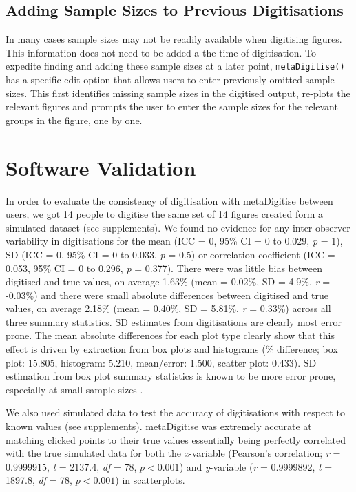 \documentclass[12pt]{article}
\newcommand{\fct}[1]{\texttt{#1()}}
\newcommand{\pkg}[1]{{\fontseries{b}\selectfont #1}}
\begin{document}
\subsection{Adding Sample Sizes to Previous Digitisations}
In many cases sample sizes may not be readily available when digitising figures. This information does not need to be added a the time of digitisation. To expedite finding and adding these sample sizes at a later point, \fct{metaDigitise} has a specific edit option that allows users to enter previously omitted sample sizes. This first identifies missing sample sizes in the digitised output, re-plots the relevant figures and prompts the user to enter the sample sizes for the relevant groups in the figure, one by one. 





\section{Software Validation}
In order to evaluate the consistency of digitisation with \pkg{metaDigitise} between users, we got 14 people to digitise the same set of 14 figures created form a simulated dataset (see supplements). We found no evidence for any inter-observer variability in digitisations for the mean (ICC = 0, 95\% CI = 0 to 0.029, \textit{p} = 1), SD (ICC = 0, 95\% CI = 0 to 0.033, \textit{p} = 0.5) or correlation coefficient (ICC = 0.053, 95\% CI = 0 to 0.296, \textit{p} = 0.377). There were was little bias between digitised and true values, on average 1.63\% (mean = 0.02\%, SD = 4.9\%, \textit{r} = -0.03\%) and there were small absolute differences between digitised and true values, on average 2.18\% (mean = 0.40\%, SD = 5.81\%, \textit{r} = 0.33\%) across all three summary statistics. SD estimates from digitisations are clearly most error prone. The mean absolute differences for each plot type clearly show that this effect is driven by extraction from box plots and histograms (\% difference; box plot: 15.805, histogram: 5.210, mean/error: 1.500, scatter plot: 0.433). SD estimation from box plot summary statistics is known to be more error prone, especially at small sample sizes \citep{Wan2014}. 

We also used simulated data to test the accuracy of digitisations with respect to known values (see supplements). \pkg{metaDigitise} was extremely accurate at matching clicked points to their true values essentially being perfectly correlated with the true simulated data for both the \textit{x}-variable (Pearson's correlation; \textit{r} = 0.9999915, \textit{t} = 2137.4, \textit{df} = 78, $p < 0.001$) and \textit{y}-variable (\textit{r} = 0.9999892, \textit{t} = 1897.8, \textit{df} = 78, $p < 0.001$) in scatterplots.
\end{document}
